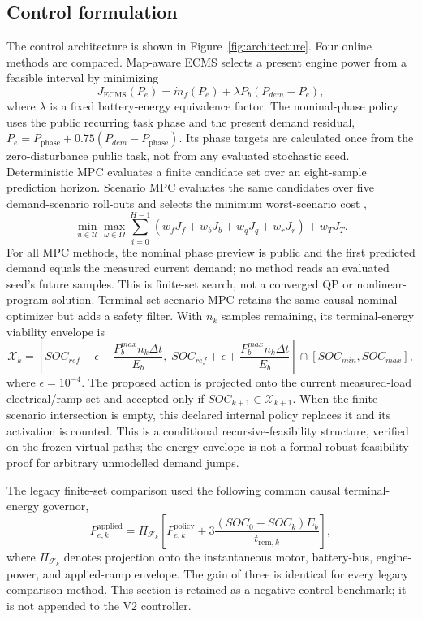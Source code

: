 \documentclass[energies,article,submit,moreauthors]{Definitions/mdpi}
\begin{document}
\subsection{Control formulation}
The control architecture is shown in Figure~\ref{fig:architecture}. Four online methods are compared. Map-aware ECMS selects a present engine power from a feasible interval by minimizing \cite{musardo2005}
\begin{equation}
 J_{\mathrm{ECMS}}(P_e)=\dot m_f(P_e)+\lambda P_{b}(P_{dem}-P_e),
\end{equation}
where $\lambda$ is a fixed battery-energy equivalence factor. The nominal-phase policy uses the public recurring task phase and the present demand residual, $P_e=P_{\mathrm{phase}}+0.75(P_{dem}-P_{\mathrm{phase}})$. Its phase targets are calculated once from the zero-disturbance public task, not from any evaluated stochastic seed. Deterministic MPC evaluates a finite candidate set over an eight-sample prediction horizon. Scenario MPC evaluates the same candidates over five demand-scenario roll-outs and selects the minimum worst-scenario cost \cite{ripaccioli2010},
\begin{equation}
 \min_{u\in\mathcal{U}}\max_{\omega\in\Omega}\sum_{i=0}^{H-1}
 (w_fJ_f+w_bJ_b+w_qJ_q+w_rJ_r)+w_TJ_T.
\end{equation}
For all MPC methods, the nominal phase preview is public and the first predicted demand equals the measured current demand; no method reads an evaluated seed's future samples. This is finite-set search, not a converged QP or nonlinear-program solution. Terminal-set scenario MPC retains the same causal nominal optimizer but adds a safety filter. With $n_k$ samples remaining, its terminal-energy viability envelope is
\begin{equation}
 \mathcal{X}_k=\left[SOC_{ref}-\epsilon-\frac{P_b^{max}n_k\Delta t}{E_b},\;SOC_{ref}+\epsilon+\frac{P_b^{max}n_k\Delta t}{E_b}\right]\cap[SOC_{min},SOC_{max}],
\end{equation}
where $\epsilon=10^{-4}$. The proposed action is projected onto the current measured-load electrical/ramp set and accepted only if $SOC_{k+1}\in\mathcal{X}_{k+1}$. When the finite scenario intersection is empty, this declared internal policy replaces it and its activation is counted. This is a conditional recursive-feasibility structure, verified on the frozen virtual paths; the energy envelope is not a formal robust-feasibility proof for arbitrary unmodelled demand jumps.

The legacy finite-set comparison used the following common causal terminal-energy governor,
\begin{equation}
 P_{e,k}^{\mathrm{applied}}=\Pi_{\mathcal{F}_k}\left[P_{e,k}^{\mathrm{policy}}+
 3\frac{(SOC_0-SOC_k)E_b}{t_{\mathrm{rem},k}}\right],
\end{equation}
where $\Pi_{\mathcal{F}_k}$ denotes projection onto the instantaneous motor, battery-bus, engine-power, and applied-ramp envelope. The gain of three is identical for every legacy comparison method. This section is retained as a negative-control benchmark; it is not appended to the V2 controller.
\end{document}
